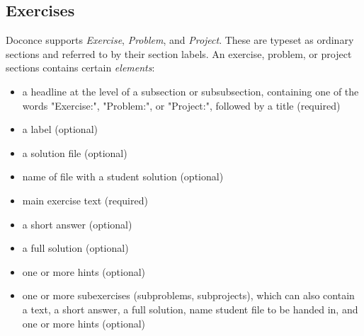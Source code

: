 \documentclass[twoside]{article}
\begin{document}
\subsection{Exercises}

Doconce supports \emph{Exercise}, \emph{Problem}, and \emph{Project}. These are typeset
as ordinary sections and referred to by their section labels.
An exercise, problem, or project sections contains certain \emph{elements}:

\begin{itemize}
  \item a headline at the level of a subsection or subsubsection,
    containing one of the words "Exercise:", "Problem:", or
    "Project:", followed by a title (required)

  \item a label (optional)

  \item a solution file (optional)

  \item name of file with a student solution (optional)

  \item main exercise text (required)

  \item a short answer (optional)

  \item a full solution (optional)

  \item one or more hints (optional)

  \item one or more subexercises (subproblems, subprojects), which can also
    contain a text, a short answer, a full solution, name student file
    to be handed in, and one or more hints (optional)
\end{itemize}
\end{document}
